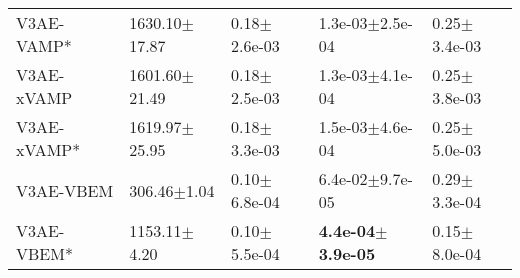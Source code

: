 \begin{tabular}{lllll}
V3AE-VAMP*             &           1630.10$\pm$17.87 &              0.18$\pm$2.6e-03 &           1.3e-03$\pm$2.5e-04 &              0.25$\pm$3.4e-03 \\
V3AE-xVAMP             &           1601.60$\pm$21.49 &              0.18$\pm$2.5e-03 &           1.3e-03$\pm$4.1e-04 &              0.25$\pm$3.8e-03 \\
V3AE-xVAMP*            &           1619.97$\pm$25.95 &              0.18$\pm$3.3e-03 &           1.5e-03$\pm$4.6e-04 &              0.25$\pm$5.0e-03 \\
V3AE-VBEM              &             306.46$\pm$1.04 &              0.10$\pm$6.8e-04 &           6.4e-02$\pm$9.7e-05 &              0.29$\pm$3.3e-04 \\
V3AE-VBEM*             &            1153.11$\pm$4.20 &              0.10$\pm$5.5e-04 &  \textbf{4.4e-04$\pm$3.9e-05} &              0.15$\pm$8.0e-04 \\
\bottomrule
\end{tabular}

